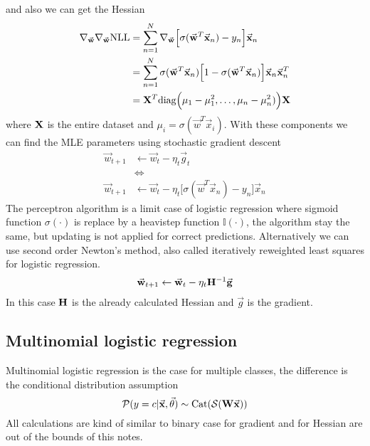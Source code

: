 \documentclass[../../main.tex]{subfiles}
\begin{document}
and also we can get the Hessian 
\begin{align*}
    \nabla_{\vec{w}} \nabla_{\vec{w}} \text{NLL}
    &= \sum_{n=1}^N 
    \nabla_{\vec{w}} \Big[\sigma(\vec{w}^T\vec{x}_n)-y_n\Big]\vec{x}_n\\
    &= \sum_{n=1}^N
    \sigma(\vec{w}^T\vec{x}_n)\Big[1-\sigma(\vec{w}^T\vec{x}_n)\Big]\vec{x}_n\vec{x}_n^T\\
    &= \mat{X}^T \text{diag}\Big(\mu_1-\mu_1^2,\dots,\mu_n-\mu_n^2)\Big) \mat{X}
\end{align*}
where $\mathbf{X}$ is the entire dataset and $\mu_i=\sigma(\vec{w}^T\vec{x}_i)$. With these components we can find the MLE parameters using stochastic gradient descent
\begin{align*}
    \vec{w}_{t+1} &\leftarrow \vec{w}_{t} - \eta_t\vec{g}_t \\
    &\Longleftrightarrow\\
    \vec{w}_{t+1} &\leftarrow \vec{w}_{t} - \eta_t\Big[\sigma(\vec{w}^T\vec{x}_n)-y_n\Big]\vec{x}_n
\end{align*}
The perceptron algorithm is a limit case of logistic regression where sigmoid function $\sigma(\cdot)$ is replace by a heavistep function $\mathbb{I}(\cdot)$, the algorithm stay the same, but updating is not applied for correct predictions.
Alternatively we can use second order Newton's method, also called iteratively reweighted least squares for logistic regression.
\begin{align*}
    \vec{w}_{t+1} &\leftarrow \vec{w}_{t} - \eta_t\mat{H}^{-1}\vec{g} \\
\end{align*}
In this case $\mathbf{H}$ is the already calculated Hessian and $\vec{g}$ is the gradient.
\subsection{Multinomial logistic regression}
Multinomial logistic regression is the case for multiple classes, the difference is the conditional distribution assumption
\begin{equation*}
    \p(y=c|\vec{x},\vec{\theta}) \sim \text{Cat}(\mathcal{S}(\mat{W} \vec{x}))
\end{equation*}
All calculations are kind of similar to binary case for gradient and for Hessian are out of the bounds of this notes.
\end{document}

